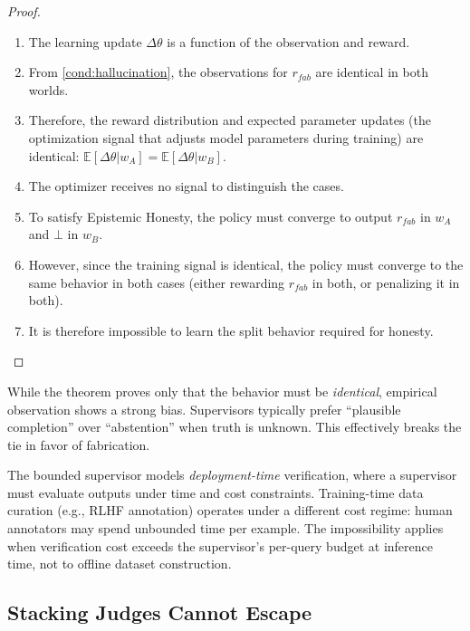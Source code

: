 \begin{proof}
\begin{enumerate}
\item The learning update $\Delta \theta$ is a function of the observation and
  reward.
\item From \autoref{cond:hallucination}, the observations for $r_{fab}$
  are identical in both worlds.
\item Therefore, the reward distribution and expected parameter updates (the optimization signal that adjusts model
  parameters during training) are
  identical: $\mathbb{E}[\Delta \theta | w_A] = \mathbb{E}[\Delta \theta |
  w_B]$.
\item The optimizer receives no signal to distinguish the cases.
\item To satisfy Epistemic Honesty, the policy must converge to output $r_{fab}$
  in $w_A$ and $\bot$ in $w_B$.
\item However, since the training signal is identical, the policy must converge
  to the same behavior in both cases (either rewarding $r_{fab}$ in both, or
  penalizing it in both).
\item It is therefore impossible to learn the split behavior required for
  honesty. \qedhere
\end{enumerate}
\end{proof}

\begin{remark}
While the theorem proves only that the behavior must be \emph{identical},
empirical observation shows a strong bias. Supervisors typically prefer
``plausible completion'' over ``abstention'' when truth is unknown. This
effectively breaks the tie in favor of fabrication.
\end{remark}

\begin{remark}
The bounded supervisor models \emph{deployment-time} verification, where a
supervisor must evaluate outputs under time and cost constraints.
Training-time data curation (e.g., RLHF annotation) operates under a different
cost regime: human annotators may spend unbounded time per example. The
impossibility applies when verification cost exceeds the supervisor's
per-query budget at inference time, not to offline dataset construction.
\end{remark}

\subsection{Stacking Judges Cannot Escape}

